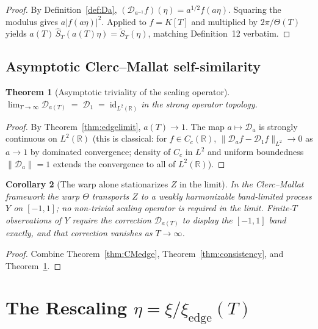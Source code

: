 \documentclass[11pt,a4paper]{article}
\theoremstyle{plain}
\newtheorem{theorem}{Theorem}
\newtheorem{corollary}[theorem]{Corollary}
\theoremstyle{definition}
\newcommand{\R}{\mathbb{R}}
\begin{document}
\begin{proof}
By Definition~\ref{def:Da}, $(\mathcal{D}_{a^{-1}} f)(\eta) = a^{1/2} f(a\eta)$. Squaring the modulus gives $a|f(a\eta)|^2$. Applied to $f=K[T]$ and multiplied by $2\pi/\Theta(T)$ yields $a(T)\,\widehat S_T(a(T)\eta) = \widetilde S_T(\eta)$, matching Definition~12 verbatim.
\end{proof}

\subsection{Asymptotic Clerc--Mallat self-similarity}

\begin{theorem}[Asymptotic triviality of the scaling operator]\label{thm:CMasymp}
$\displaystyle \lim_{T\to\infty}\mathcal{D}_{a(T)} \;=\; \mathcal{D}_1 \;=\; \mathrm{id}_{L^2(\R)}$ in the strong operator topology.
\end{theorem}

\begin{proof}
By Theorem~\ref{thm:edgelimit}, $a(T)\to 1$. The map $a\mapsto\mathcal{D}_a$ is strongly continuous on $L^2(\R)$ (this is classical: for $f\in C_c(\R)$, $\|\mathcal{D}_a f - \mathcal{D}_1 f\|_{L^2}\to 0$ as $a\to 1$ by dominated convergence; density of $C_c$ in $L^2$ and uniform boundedness $\|\mathcal{D}_a\|=1$ extends the convergence to all of $L^2(\R)$).
\end{proof}

\begin{corollary}[The warp alone stationarizes $Z$ in the limit]\label{cor:warpstat}
In the Clerc--Mallat framework the warp $\Theta$ transports $Z$ to a weakly harmonizable band-limited process $Y$ on $[-1,1]$; no non-trivial scaling operator is required in the limit. Finite-$T$ observations of $Y$ require the correction $\mathcal{D}_{a(T)}$ to display the $[-1,1]$ band exactly, and that correction vanishes as $T\to\infty$.
\end{corollary}

\begin{proof}
Combine Theorem~\ref{thm:CMedge}, Theorem~\ref{thm:consistency}, and Theorem~\ref{thm:CMasymp}.
\end{proof}

\section{The Rescaling $\eta=\xi/\xi_{\mathrm{edge}}(T)$}\label{sec:rescale}
\end{document}
